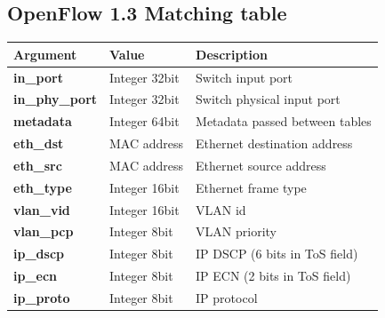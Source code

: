\documentclass[12pt, oneside]{book}
\begin{document}
\subsection{OpenFlow 1.3 Matching table}
\begin{longtable}{|l|l|l|}
	\hline
	\rowcolor[HTML]{C0C0C0} 
	\textbf{Argument}         & \textbf{Value} & \textbf{Description}                                                                                   \\ \hline
	\textbf{in\_port}         & Integer 32bit  & Switch input port                                                                                      \\ \hline
	\textbf{in\_phy\_port}    & Integer 32bit  & Switch physical input port                                                                             \\ \hline
	\textbf{metadata}         & Integer 64bit  & Metadata passed between tables                                                                         \\ \hline
	\textbf{eth\_dst}         & MAC address    & Ethernet destination address                                                                           \\ \hline
	\textbf{eth\_src}         & MAC address    & Ethernet source address                                                                                \\ \hline
	\textbf{eth\_type}        & Integer 16bit  & Ethernet frame type                                                                                    \\ \hline
	\textbf{vlan\_vid}        & Integer 16bit  & VLAN id                                                                                                \\ \hline
	\textbf{vlan\_pcp}        & Integer 8bit   & VLAN priority                                                                                          \\ \hline
	\textbf{ip\_dscp}         & Integer 8bit   & IP DSCP (6 bits in ToS field)                                                                          \\ \hline
	\textbf{ip\_ecn}          & Integer 8bit   & IP ECN (2 bits in ToS field)                                                                           \\ \hline
	\textbf{ip\_proto}        & Integer 8bit   & IP protocol                                                                                            \\ \hline

\end{longtable}
\end{document}
